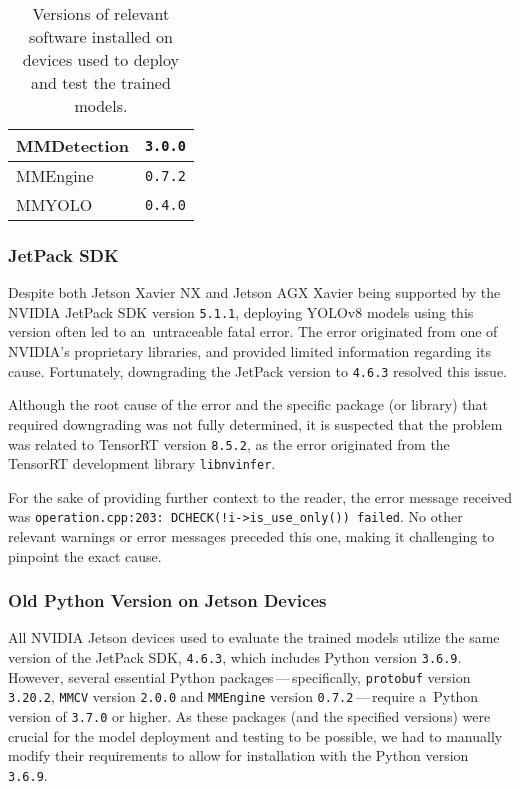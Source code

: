 \begin{table}[t]
\begin{threeparttable}
\begin{tabular}{|l|c|c|c|c|}
            \hline
            MMDetection      & \multicolumn{4}{c|}{\texttt{3.0.0}} \\
            \hline
            MMEngine         & \multicolumn{4}{c|}{\texttt{0.7.2}} \\
            \hline
            MMYOLO           & \multicolumn{4}{c|}{\texttt{0.4.0}} \\
            \hline
        \end{tabular}
        \caption{Versions of relevant software installed on devices used to
        deploy and test the trained models.}
        \label{DevicesPackages}
    \end{threeparttable}
\end{table}


\subsubsection*{JetPack SDK}

Despite both Jetson Xavier NX and Jetson AGX Xavier being supported by the
NVIDIA JetPack SDK version \texttt{5.1.1}, deploying YOLOv8 models using this
version often led to an~untraceable fatal error. The error originated from one
of NVIDIA's proprietary libraries, and provided limited information regarding
its cause. Fortunately, downgrading the JetPack version to \texttt{4.6.3}
resolved this issue.

Although the root cause of the error and the specific package (or library) that
required downgrading was not fully determined, it is suspected that the problem
was related to TensorRT version \texttt{8.5.2}, as the error originated from the
TensorRT development library \texttt{libnvinfer}.

For the sake of providing further context to the reader, the error message
received was \verb|operation.cpp:203: DCHECK(!i->is_use_only()) failed|. No
other relevant warnings or error messages preceded this one, making it
challenging to pinpoint the exact cause.


\subsubsection*{Old Python Version on Jetson Devices}

All NVIDIA Jetson devices used to evaluate the trained models utilize the same
version of the JetPack SDK, \texttt{4.6.3}, which includes Python version
\texttt{3.6.9}. However, several essential Python packages\,---\,specifically,
\texttt{protobuf} version \texttt{3.20.2}, \texttt{MMCV} version \texttt{2.0.0}
and \texttt{MMEngine} version \texttt{0.7.2}\,---\,require a~Python version of
\texttt{3.7.0} or higher. As these packages (and the specified versions) were
crucial for the model deployment and testing to be possible, we had to manually
modify their requirements to allow for installation with the Python version
\texttt{3.6.9}.

